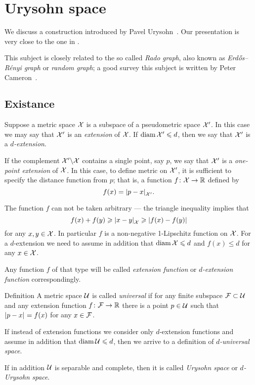 \chapter{Urysohn space}

We discuss a construction introduced by Pavel Urysohn~\cite{urysohn}.
Our presentation is very close to the one in \cite{gromov-2007}.

This subject is closely related to the so called \emph{Rado graph},
also known as \emph{Erd\H{o}s–R\'enyi graph} or \emph{random graph}; a good survey this subject is written by Peter Cameron~\cite{cameron}.

\section{Existance}
Suppose a metric space $\mathcal{X}$ is a subspace of a pseudometric space $\mathcal{X}'$.
In this case we may say that $\mathcal{X}'$ is an \emph{extension} of $\mathcal{X}$.
If $\operatorname{\rm diam}\nolimits\mathcal{X}'\leqslant d$, then we say that $\mathcal{X}'$ is a \emph{$d$-extension}.

If the complement $\mathcal{X}'\backslash \mathcal{X}$ contains a single point, say $p$, we say that $\mathcal{X}'$ is a \emph{one-point extension} of $\mathcal{X}$.
In this case, to define metric on $\mathcal{X}'$, it is sufficient to specify the distance function from $p$; that is, a function $f\colon\mathcal{X}\to\mathbb{R}$ defined by 
\[f(x)=\dist{p}{x}{\spc{X}'}.\]

The function $f$ can not be taken arbitrary --- the triangle inequality implies that 
\[f(x)+f(y)\ge \dist{x}{y}{\spc{X}}\ge |f(x)-f(y)|\]
for any $x,y\in \mathcal{X}$.
In particular $f$ is a non-negative 1-Lipschitz function on $\mathcal{X}$.
For a $d$-extension we need to assume in addition that $\operatorname{\rm diam}\nolimits\mathcal{X}\leqslant d$ and $f(x)\le d$ for any $x\in \mathcal{X}$.

Any function $f$ of that type will be called \emph{extension function} or \emph{$d$-extension function} correspondingly.

\begin{thm}{Definition}\label{def:universal}
A metric space $\mathcal{U}$ is called \emph{universal}  if for any finite subspace $\mathcal{F}\subset\mathcal{U}$ and any extension function $f\colon\mathcal{F}\to\mathbb{R}$ there is a point $p\in \mathcal{U}$ such that $\dist{p}{x}{}=f(x)$ for any $x\in \mathcal{F}$.

If instead of extension functions we consider only $d$-extension functions and assume in addition that $\operatorname{\rm diam}\nolimits \mathcal{U}\leqslant d$, then we arrive to a definition of \emph{$d$-universal space}.

If in addition $\mathcal{U}$ is separable and complete, then it is called \emph{Urysohn space} or \emph{$d$-Urysohn space}.
\end{thm}


